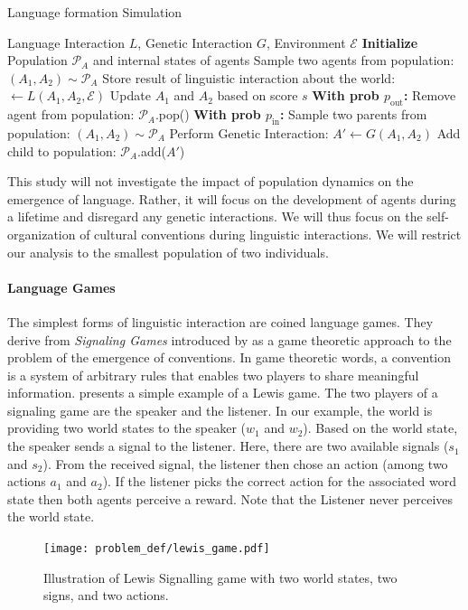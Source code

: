 %
\begin{algorithm}[!h]
    \begin{algorithmic}
    \small
        \caption{\label{alg:langage-acquisition}Language formation Simulation}
        \REQUIRE Language Interaction $L$, Genetic Interaction $G$, Environment $\mathcal{E}$
        \STATE \textbf{Initialize} Population $\mathcal{P}_A$ and internal states of agents 
		\LOOP
        \STATE Sample two agents from population: $(A_1,A_2) \sim \mathcal{P}_A$ 
        \STATE Store result of linguistic interaction about the world: $ \leftarrow L(A_1,A_2,\mathcal{E})$
        \STATE Update $A_1$ and $A_2$ based on score $s$
        \STATE \textbf{With prob $p_{\text{out}}$:}
        \bindent
        \STATE Remove agent from population: $\mathcal{P}_A$.pop()
        \eindent
        \STATE \textbf{With prob $p_{\text{in}}$:}
        \bindent
        \STATE Sample two parents from population: $(A_1,A_2) \sim \mathcal{P}_A$  
        \STATE Perform Genetic Interaction: $A' \leftarrow G(A_1,A_2)$
        \STATE Add child to population: $\mathcal{P}_A$.add($A'$)
        \eindent
        \ENDLOOP
    \end{algorithmic}
\end{algorithm}

This study will not investigate the impact of population dynamics on the emergence of language. Rather, it will focus on the development of agents during a lifetime and disregard any genetic interactions. We will thus focus on the self-organization of cultural conventions during linguistic interactions. We will restrict our analysis to the smallest population of two individuals. 

\newpage
\paragraph{Language Games}

The simplest forms of linguistic interaction are coined language games. They derive from \textit{Signaling Games} introduced by \citet{Lewis1969} as a game theoretic approach to the problem of the emergence of conventions. In game theoretic words, a convention is a system of arbitrary rules that enables two players to share meaningful information.   presents a simple example of a Lewis game. The two players of a signaling game are the speaker and the listener. In our example, the world is providing two world states to the speaker ($w_1$ and $w_2$). Based on the world state, the speaker sends a signal to the listener. Here, there are two available signals ($s_1$ and $s_2$). From the received signal, the listener then chose an action (among two actions $a_1$ and $a_2$). If the listener picks the correct action for the associated word state then both agents perceive a reward. Note that the Listener never perceives the world state.  
\begin{figure}[!h]
\centering
\texttt{[image: problem\_def/lewis\_game.pdf]}
\caption{Illustration of Lewis Signalling game with two world states, two signs, and two actions.}
\label{fig:lewis_game}
\end{figure}

